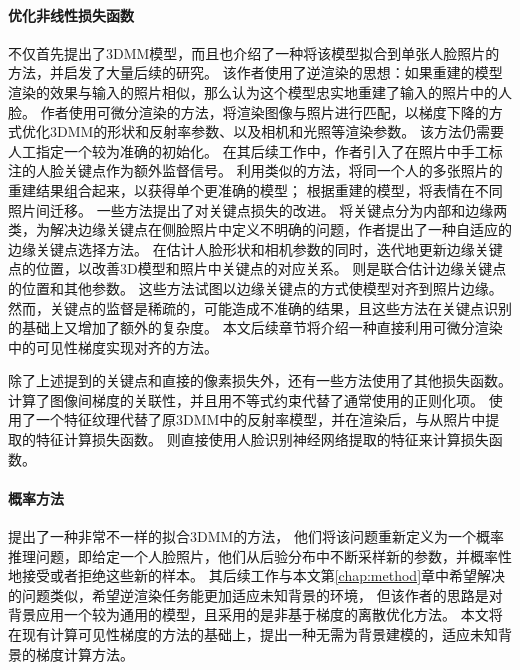 \paragraph{优化非线性损失函数}
\citet{3DMM}不仅首先提出了3DMM模型，而且也介绍了一种将该模型拟合到单张人脸照片的方法，并启发了大量后续的研究。
该作者使用了逆渲染的思想：如果重建的模型渲染的效果与输入的照片相似，那么认为这个模型忠实地重建了输入的照片中的人脸。
作者使用可微分渲染的方法，将渲染图像与照片进行匹配，以梯度下降的方式优化3DMM的形状和反射率参数、以及相机和光照等渲染参数。
该方法仍需要人工指定一个较为准确的初始化。
在其后续工作\citep{BlanzV03}中，作者引入了在照片中手工标注的人脸关键点作为额外监督信号。
利用类似的方法，\citet{piotraschke2016automated}将同一个人的多张照片的重建结果组合起来，以获得单个更准确的模型；
\citet{thies2016face2face}根据重建的模型，将表情在不同照片间迁移。
一些方法提出了对关键点损失的改进。
\citet{qu122015adaptive}将关键点分为内部和边缘两类，为解决边缘关键点在侧脸照片中定义不明确的问题，作者提出了一种自适应的边缘关键点选择方法。
\citet{liu2019single}在估计人脸形状和相机参数的同时，迭代地更新边缘关键点的位置，以改善3D模型和照片中关键点的对应关系。
\citet{zhu2015high}则是联合估计边缘关键点的位置和其他参数。
这些方法试图以边缘关键点的方式使模型对齐到照片边缘。
然而，关键点的监督是稀疏的，可能造成不准确的结果，且这些方法在关键点识别的基础上又增加了额外的复杂度。
本文后续章节将介绍一种直接利用可微分渲染中的可见性梯度实现对齐的方法。

除了上述提到的关键点和直接的像素损失外，还有一些方法使用了其他损失函数。
\citet{sariyanidi2020inequality}计算了图像间梯度的关联性，并且用不等式约束代替了通常使用的正则化项。
\citet{booth20183d}使用了一个特征纹理代替了原3DMM中的反射率模型，并在渲染后，与从照片中提取的特征计算损失函数。
\citet{gecer2019ganfit}则直接使用人脸识别神经网络提取的特征来计算损失函数。

\paragraph{概率方法}
\citet{schonborn2013monte}提出了一种非常不一样的拟合3DMM的方法，
他们将该问题重新定义为一个概率推理问题，即给定一个人脸照片，他们从后验分布中不断采样新的参数，并概率性地接受或者拒绝这些新的样本。
其后续工作\citep{SchonbornEFV15}与本文第\ref{chap:method}章中希望解决的问题类似，希望逆渲染任务能更加适应未知背景的环境，
但该作者的思路是对背景应用一个较为通用的模型，且采用的是非基于梯度的离散优化方法。
本文将在现有计算可见性梯度的方法的基础上，提出一种无需为背景建模的，适应未知背景的梯度计算方法。

